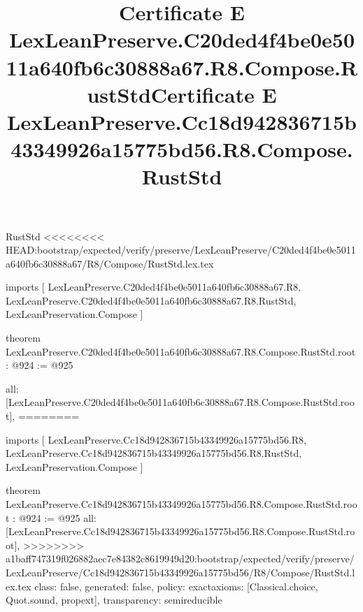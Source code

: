 \begin{lexlean}{RustStd}
<<<<<<<< HEAD:bootstrap/expected/verify/preserve/LexLeanPreserve/C20ded4f4be0e5011a640fb6c30888a67/R8/Compose/RustStd.lex.tex
\title{Certificate E LexLeanPreserve.C20ded4f4be0e5011a640fb6c30888a67.R8.Compose.RustStd}
\begin{coremodule}
imports [
  LexLeanPreserve.C20ded4f4be0e5011a640fb6c30888a67.R8,
  LexLeanPreserve.C20ded4f4be0e5011a640fb6c30888a67.R8.RustStd,
  LexLeanPreservation.Compose
]

theorem LexLeanPreserve.C20ded4f4be0e5011a640fb6c30888a67.R8.Compose.RustStd.root : @924 := @925 {
  all: [LexLeanPreserve.C20ded4f4be0e5011a640fb6c30888a67.R8.Compose.RustStd.root],
========
\title{Certificate E LexLeanPreserve.Cc18d942836715b43349926a15775bd56.R8.Compose.RustStd}
\begin{coremodule}
imports [
  LexLeanPreserve.Cc18d942836715b43349926a15775bd56.R8,
  LexLeanPreserve.Cc18d942836715b43349926a15775bd56.R8.RustStd,
  LexLeanPreservation.Compose
]

theorem LexLeanPreserve.Cc18d942836715b43349926a15775bd56.R8.Compose.RustStd.root : @924 := @925 {
  all: [LexLeanPreserve.Cc18d942836715b43349926a15775bd56.R8.Compose.RustStd.root],
>>>>>>>> a1baff747319f026882aec7e84382c8619949d20:bootstrap/expected/verify/preserve/LexLeanPreserve/Cc18d942836715b43349926a15775bd56/R8/Compose/RustStd.lex.tex
  class: false,
  generated: false,
  policy: exact{axioms: [Classical.choice, Quot.sound, propext]},
  transparency: semireducible
}


\end{coremodule}}
\end{coremodule}
\end{lexlean}
